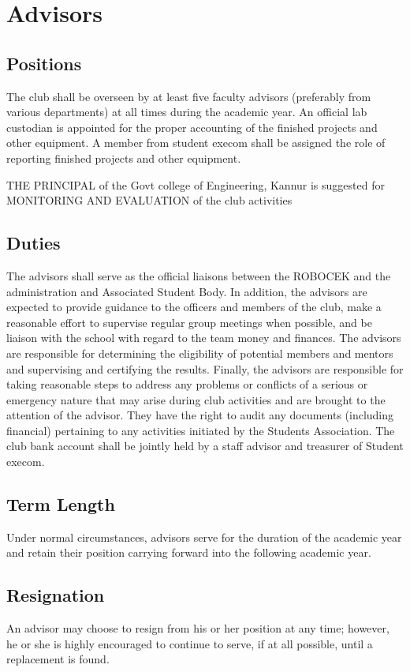 \section{Advisors}

\subsection{Positions}
The club shall be overseen by at least five faculty advisors (preferably from various departments) at all times during the academic year. An official lab custodian is appointed for the proper accounting of the finished projects and other equipment. A member from student execom shall be assigned the role of reporting finished projects and other equipment.

THE PRINCIPAL of the Govt college of Engineering, Kannur is suggested for MONITORING AND EVALUATION of the club activities

\subsection{Duties}
The advisors shall serve as the official liaisons between the ROBOCEK and the administration and Associated Student Body. In addition, the advisors are expected to provide guidance to the officers and members of the club, make a reasonable effort to supervise regular group meetings when possible, and be liaison with the school with regard to the team money and finances. The advisors are responsible for determining the eligibility of potential members and mentors and supervising and certifying the results. Finally, the advisors are responsible for taking reasonable steps to address any problems or conflicts of a serious or emergency nature that may arise during club activities and are brought to the attention of the advisor. They have the right to audit any documents (including financial) pertaining to any activities initiated by the Students Association. The club bank account shall be jointly held by a staff advisor and treasurer of Student execom.

\subsection{Term Length}
Under normal circumstances, advisors serve for the duration of the academic year and retain their position carrying forward into the following  academic year.

\subsection{Resignation}
An advisor may choose to resign from his or her position at any time; however, he or she is highly encouraged to continue to serve, if at all possible, until a replacement is found.

